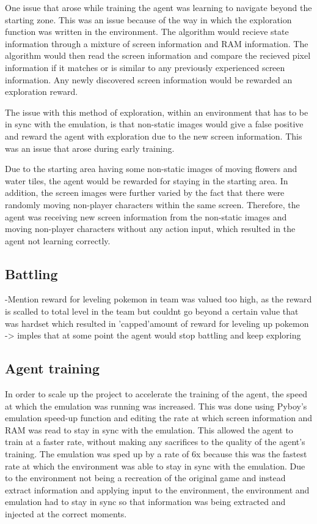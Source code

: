One issue that arose while training the agent was learning to navigate beyond the starting zone. This was an issue because of the way in which the exploration function was written in the environment. The algorithm would recieve state information through a mixture of screen information and RAM information. The algorithm would then read the screen information and compare the recieved pixel information if it matches or is similar to any previously experienced screen information. Any newly discovered screen information would be rewarded an exploration reward. 

The issue with this method of exploration, within an environment that has to be in sync with the emulation, is that non-static images would give a false positive and reward the agent with exploration due to the new screen information. This was an issue that arose during early training. 

Due to the starting area having some non-static images of moving flowers and water tiles, the agent would be rewarded for staying in the starting area. In addition, the screen images were further varied by the fact that there were randomly moving non-player characters within the same screen. Therefore, the agent was receiving new screen information from the non-static images and moving non-player characters without any action input, which resulted in the agent not learning correctly.

\subsection{Battling}



-Mention reward for leveling pokemon in team was valued too high, as the reward is scalled to total level in the team but couldnt go beyond a certain value that was hardset which resulted in 'capped'amount of reward for leveling up pokemon -> imples that at some point the agent would stop battling and keep exploring 

\subsection{Agent training}

In order to scale up the project to accelerate the training of the agent, the speed at which the emulation was running was increased. This was done using Pyboy's emulation speed-up function and editing the rate at which screen information and RAM was read to stay in sync with the emulation. This allowed the agent to train at a faster rate, without making any sacrifices to the quality of the agent's training. The emulation was sped up by a rate of 6x because this was the fastest rate at which the environment was able to stay in sync with the emulation. Due to the environment not being a recreation of the original game and instead extract information and applying input to the environment, the environment and emulation had to stay in sync so that information was being extracted and injected at the correct moments.

